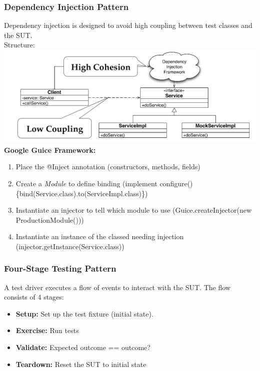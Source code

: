 \subsubsection{Dependency Injection Pattern}
Dependency injection is designed to avoid high coupling between test classes and the SUT.\\
Structure:\\
\includegraphics[width=\linewidth]{images/testing_pattern_dependency_injection.png}\\
\textbf{Google Guice Framework:}
\begin{enumerate}
  \item Place the @Inject annotation (constructors, methods, fields)
  \item Create a \textit{Module} to define binding (implement configure()\{bind(Service.class).to(ServiceImpl.class)\})
  \item Instantiate an injector to tell which module to use (Guice.createInjector(new ProductionModule()))
  \item Instantiate an instance of the classed needing injection (injector.getInstance(Service.class))
\end{enumerate}
\newpage

\subsubsection{Four-Stage Testing Pattern}
A test driver executes a flow of events to interact with the SUT.
The flow consists of 4 stages:
\begin{itemize}
  \item \textbf{Setup:} Set up the test fixture (initial state).
  \item \textbf{Exercise:} Run tests
  \item \textbf{Validate:} Expected outcome == outcome?
  \item \textbf{Teardown:} Reset the SUT to initial state
\end{itemize}
\newpage

